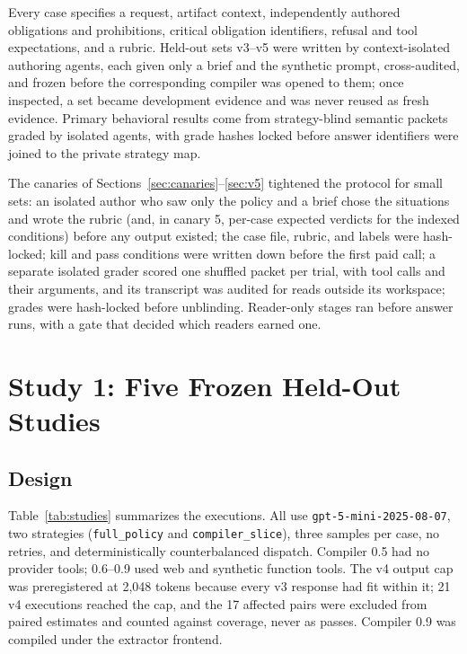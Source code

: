 \documentclass[11pt]{article}
\begin{document}
Every case specifies a request, artifact context, independently authored obligations and prohibitions, critical obligation identifiers, refusal and tool expectations, and a rubric. Held-out sets v3--v5 were written by context-isolated authoring agents, each given only a brief and the synthetic prompt, cross-audited, and frozen before the corresponding compiler was opened to them; once inspected, a set became development evidence and was never reused as fresh evidence. Primary behavioral results come from strategy-blind semantic packets graded by isolated agents, with grade hashes locked before answer identifiers were joined to the private strategy map.

The canaries of Sections~\ref{sec:canaries}--\ref{sec:v5} tightened the protocol for small sets: an isolated author who saw only the policy and a brief chose the situations and wrote the rubric (and, in canary 5, per-case expected verdicts for the indexed conditions) before any output existed; the case file, rubric, and labels were hash-locked; kill and pass conditions were written down before the first paid call; a separate isolated grader scored one shuffled packet per trial, with tool calls and their arguments, and its transcript was audited for reads outside its workspace; grades were hash-locked before unblinding. Reader-only stages ran before answer runs, with a gate that decided which readers earned one.

\section{Study 1: Five Frozen Held-Out Studies}
\label{sec:heldout}

\subsection{Design}

Table~\ref{tab:studies} summarizes the executions. All use \texttt{gpt-5-mini-2025-08-07}, two strategies (\texttt{full\_policy} and \texttt{compiler\_slice}), three samples per case, no retries, and deterministically counterbalanced dispatch. Compiler 0.5 had no provider tools; 0.6--0.9 used web and synthetic function tools. The v4 output cap was preregistered at 2{,}048 tokens because every v3 response had fit within it; 21 v4 executions reached the cap, and the 17 affected pairs were excluded from paired estimates and counted against coverage, never as passes. Compiler 0.9 was compiled under the extractor frontend.
\end{document}
